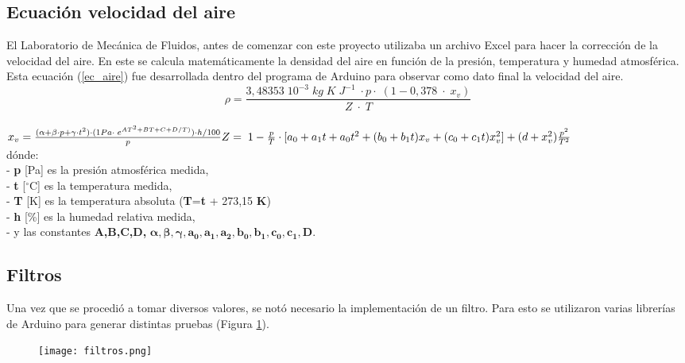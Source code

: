 \subsection{Ecuación velocidad del aire}
El Laboratorio de Mecánica de Fluidos, antes de comenzar con este proyecto utilizaba un archivo Excel para hacer la corrección de la velocidad del aire. En este se calcula matemáticamente la densidad del aire en función de la presión, temperatura y humedad atmosférica. Esta ecuación (\ref{ec_aire}) fue desarrollada dentro del programa de Arduino para observar como dato final la velocidad del aire.\\
\begin{equation}
\rho=\frac{3,48353\;10^{-3}\;kg\;K\;J^{-1}\;\cdot p\cdot\;(1-0,378\;\cdot\;x_v)}{Z\;\cdot\;T} \label{ec_aire}
\end{equation}	
\\
\begin{math}
	x_v=\frac{(\alpha+\beta\cdot p+\gamma\cdot t^2)\cdot(1Pa\cdot\;e^{AT^2+BT+C+D/T)})\cdot h/100}p\\\\
	Z=\;1-\frac pT\cdot\lbrack a_0+a_1t+a_0t^2+(b_0+b_1t)x_v+(c_0+c_1t)x_v^2\rbrack+(d+x_v^2)\frac{p^2}{T^2}
\end{math}
\\
dónde:\\
- \textbf{p } [Pa] es la presión atmosférica medida,\\
- \textbf{t } [$^{\circ}$C] es la temperatura medida,\\
- \textbf{T } [K] es la temperatura absoluta (\textbf{T}=\textbf{t} + 273,15 \textbf{K})\\
- \textbf{h } [\%] es la humedad relativa medida,\\
- y las constantes \textbf{A,B,C,D,} $\boldsymbol{\alpha , \beta  , \gamma , a_0, a_1 ,a_2 ,b_0  ,b_1 , c_0 , c_1, D. }$






\subsection{Filtros}
Una vez que se procedió a tomar diversos valores, se notó necesario la implementación de un filtro. Para esto se utilizaron varias librerías de Arduino para generar distintas pruebas (Figura \ref{fig:filtros}). 

\begin{figure}[htb]
	\centering
	\texttt{[image: filtros.png]}
	\label{fig:filtros}
\end{figure}

